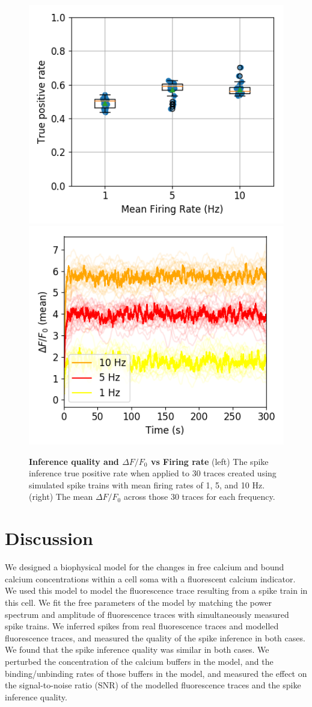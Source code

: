 \documentclass[a4paper,12pt]{article}
\theoremstyle{definition}
\begin{document}
\begin{figure}[h]
\centering
  \includegraphics[width=0.4\linewidth]{figures/simulated_oasis_tp_paper.png}
  \includegraphics[width=0.4\linewidth]{figures/mean_fluorescence_comparison.png}
  \caption{\textbf{Inference quality and $\Delta F/F_0$ vs Firing rate} (left) The spike inference true positive rate when applied to 30 traces created using simulated spike trains with mean firing rates of 1, 5, and 10 Hz. (right) The mean $\Delta F/F_0$ across those 30 traces for each frequency.}
  \label{fig:frequency_comparison_measures}
\end{figure}

\section{Discussion}
We designed a biophysical model for the changes in free calcium and bound calcium concentrations within a cell soma with a fluorescent calcium indicator. We used this model to model the fluorescence trace resulting from a spike train in this cell.  We fit the free parameters of the model by matching the power spectrum and amplitude of fluorescence traces with simultaneously measured spike trains. We inferred spikes from real fluorescence traces and modelled fluorescence traces, and measured the quality of the spike inference in both cases. We found that the spike inference quality was similar in both cases. We perturbed the concentration of the calcium buffers in the model, and the binding/unbinding rates of those buffers in the model, and measured the effect on the signal-to-noise ratio (SNR) of the modelled fluorescence traces and the spike inference quality.
\end{document}
